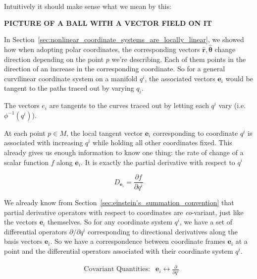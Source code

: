 	 Intuitively it should make sense what we mean by this: 
	
	\textbf{PICTURE OF A BALL WITH A VECTOR FIELD ON IT}
	
	In Section~\ref{sec:nonlinear_coordinate_systems_are_locally_linear}, we showed how when adopting polar coordinates, the corresponding vectors $\hat{\mathbf{r}},\hat{\mathbf{\theta}}$ change direction depending on the point $p$ we're describing. Each of them points in the direction of an increase in the corresponding coordinate. So for a general curvilinear coordinate system on a manifold $q^i$, the associated vectors $\mathbf e_i$ would be tangent to the paths traced out by varying $q_i$. 
	
	The vectors $e_i$ are tangents to the curves traced out by letting each $q^i$ vary (i.e. $\phi^{-1} (q^i)$). 
	
	At each point $p \in M$, the local tangent vector $\mathbf e_i$ corresponding to coordinate $q^i$ is associated with increasing $q^i$ while holding all other coordinates fixed. This already gives us enough information to know one thing: the rate of change of a scalar function $f$ along $\mathbf e_i$. It is exactly the partial derivative with respect to $q^i$
	
	\begin{equation}
		D_{\mathbf e_i} = \frac{\partial f}{\partial q^i}
	\end{equation}
	
	We already know from Section~\ref{sec:einstein's_summation_convention} that partial derivative operators with respect to coordinates are \emph{co}-variant, just like the vectors $\mathbf e_i$ themselves. So for any coordinate system $q^i$, we have a set of differential operators $\partial/\partial q^i$ corresponding to directional derivatives along the basis vectors $\mathbf e_i$. So we have a correspondence between coordinate frames $\mathbf e_i$ at a point and the differential operators associated with their coordinate system $q^i$.
	
	\begin{align*}
		&\text{Covariant Quantities:}&  \mathbf e_i \longleftrightarrow \frac{\partial}{\partial q^i}
	\end{align*}
	
